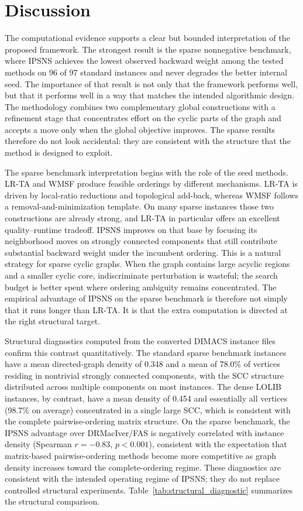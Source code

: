 \section{Discussion}
\label{sec:discussion}

The computational evidence supports a clear but bounded interpretation of the proposed framework. The strongest result is the sparse nonnegative benchmark, where IPSNS achieves the lowest observed backward weight among the tested methods on 96 of 97 standard instances and never degrades the better internal seed. The importance of that result is not only that the framework performs well, but that it performs well in a way that matches the intended algorithmic design. The methodology combines two complementary global constructions with a refinement stage that concentrates effort on the cyclic parts of the graph and accepts a move only when the global objective improves. The sparse results therefore do not look accidental: they are consistent with the structure that the method is designed to exploit.

The sparse benchmark interpretation begins with the role of the seed methods. LR-TA and WMSF produce feasible orderings by different mechanisms. LR-TA is driven by local-ratio reductions and topological add-back, whereas WMSF follows a removal-and-minimization template. On many sparse instances those two constructions are already strong, and LR-TA in particular offers an excellent quality--runtime tradeoff. IPSNS improves on that base by focusing its neighborhood moves on strongly connected components that still contribute substantial backward weight under the incumbent ordering. This is a natural strategy for sparse cyclic graphs. When the graph contains large acyclic regions and a smaller cyclic core, indiscriminate perturbation is wasteful; the search budget is better spent where ordering ambiguity remains concentrated. The empirical advantage of IPSNS on the sparse benchmark is therefore not simply that it runs longer than LR-TA. It is that the extra computation is directed at the right structural target.

Structural diagnostics computed from the converted DIMACS instance files confirm this contrast quantitatively. The standard sparse benchmark instances have a mean directed-graph density of 0.348 and a mean of 78.0\% of vertices residing in nontrivial strongly connected components, with the SCC structure distributed across multiple components on most instances. The dense LOLIB instances, by contrast, have a mean density of 0.454 and essentially all vertices (98.7\% on average) concentrated in a single large SCC, which is consistent with the complete pairwise-ordering matrix structure. On the sparse benchmark, the IPSNS advantage over DRMacIver/FAS is negatively correlated with instance density (Spearman $r = -0.83$, $p < 0.001$), consistent with the expectation that matrix-based pairwise-ordering methods become more competitive as graph density increases toward the complete-ordering regime. These diagnostics are consistent with the intended operating regime of IPSNS; they do not replace controlled structural experiments. Table~\ref{tab:structural_diagnostic} summarizes the structural comparison.

